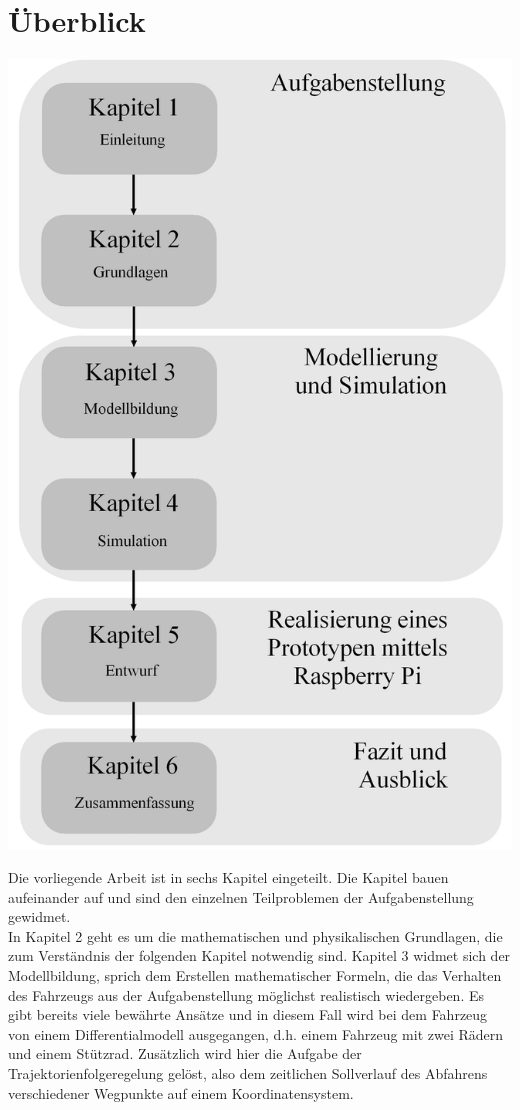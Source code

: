 \section{Überblick}
\label{subsec:überblick}
\begin{minipage}{0.4\textwidth}
\includegraphics[width=\textwidth]{img/kapitel.jpg}
\end{minipage}
\begin{minipage}{0.6\textwidth}
Die vorliegende Arbeit ist in sechs Kapitel eingeteilt.
Die Kapitel bauen aufeinander auf und sind den einzelnen Teilproblemen der Aufgabenstellung gewidmet. \\
In Kapitel 2 geht es um die mathematischen und physikalischen Grundlagen, die zum Verständnis der folgenden Kapitel notwendig sind.
Kapitel 3 widmet sich der Modellbildung, sprich dem Erstellen mathematischer Formeln, die das Verhalten des Fahrzeugs aus der Aufgabenstellung möglichst realistisch wiedergeben. Es gibt bereits viele bewährte Ansätze und in diesem Fall wird bei dem Fahrzeug von einem Differentialmodell ausgegangen, d.h. einem Fahrzeug mit zwei Rädern und einem Stützrad. Zusätzlich wird hier die Aufgabe der Trajektorienfolgeregelung gelöst, also dem zeitlichen Sollverlauf des Abfahrens verschiedener Wegpunkte auf einem Koordinatensystem. \vspace{.15cm}
\end{minipage}
